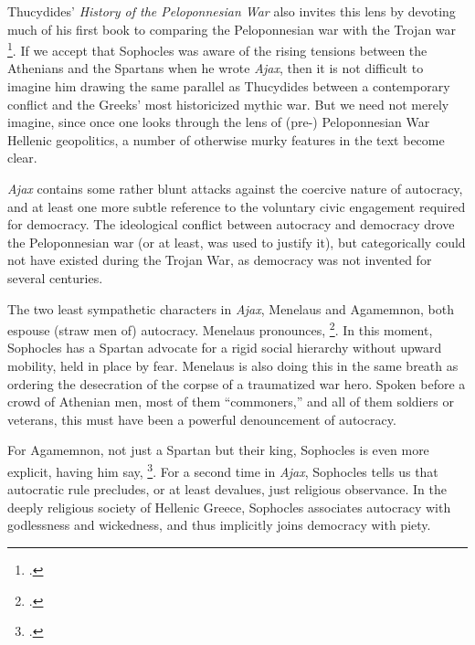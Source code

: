 Thucydides' \textit{History of the Peloponnesian War} also invites this lens by devoting
much of his first book to comparing the Peloponnesian war with the Trojan
war \footcite[e.g. ch. 1.23]{thucydides_war}. If we accept that Sophocles was aware of the
rising tensions between the Athenians and the Spartans when he wrote \textit{Ajax}, then
it is not difficult to imagine him drawing the same parallel as Thucydides between a
contemporary conflict and the Greeks' most historicized mythic war. But we need not merely
imagine, since once one looks through the lens of (pre-) Peloponnesian War Hellenic
geopolitics, a number of otherwise murky features in the text become clear.


\textit{Ajax} contains some rather blunt attacks against the coercive nature of autocracy,
and at least one more subtle reference to the voluntary civic engagement required for
democracy. The ideological conflict between autocracy and democracy drove the
Peloponnesian war (or at least, was used to justify it), but categorically could not have
existed during the Trojan War, as democracy was not invented for several centuries.


The two least sympathetic characters in \textit{Ajax}, Menelaus and Agamemnon, both
espouse (straw men of) autocracy. Menelaus pronounces,  \footcite[ll. 1072--1075]{ajax}. In this moment, Sophocles has a Spartan advocate
for a rigid social hierarchy without upward mobility, held in place by fear. Menelaus is
also doing this in the same breath as ordering the desecration of the corpse of a
traumatized war hero. Spoken before a crowd of Athenian men, most of them
\enquote{commoners,} and all of them soldiers or veterans, this must have been a powerful
denouncement of autocracy.


For Agamemnon, not just a Spartan but their king, Sophocles is even more explicit, having
him say,  \footcite[l. 1350]{ajax}. For a second time in \textit{Ajax}, Sophocles tells
us that autocratic rule precludes, or at least devalues, just religious observance. In the
deeply religious society of Hellenic Greece, Sophocles associates autocracy with
godlessness and wickedness, and thus implicitly joins democracy with piety.


